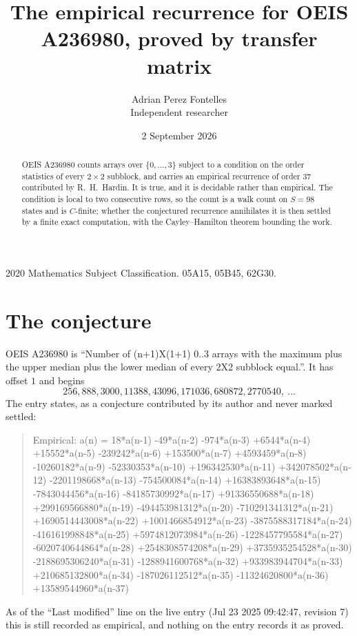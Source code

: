 \documentclass[11pt,a4paper]{article}
\title{The empirical recurrence for OEIS A236980, proved by transfer matrix}
\author{Adrian Perez Fontelles\\ \small Independent researcher}
\date{2 September 2026}
\theoremstyle{plain}
\theoremstyle{definition}
\begin{document}
\maketitle

\begin{abstract}
OEIS A236980 counts arrays over $\{0,\dots,3\}$ subject to a condition on the order
statistics of every $2\times2$ subblock, and carries an empirical recurrence of order
$37$ contributed by R.~H.~Hardin. It is true, and it is decidable rather than empirical.
The condition is local to two consecutive rows, so the count is a walk count on $S=98$
states and is $C$-finite; whether the conjectured recurrence annihilates it is then settled by
a finite exact computation, with the Cayley--Hamilton theorem bounding the work.
\end{abstract}

\noindent\small 2020 Mathematics Subject Classification. 05A15, 05B45, 62G30.\normalsize

\section{The conjecture}

OEIS A236980 is ``Number of (n+1)X(1+1) 0..3 arrays with the maximum plus the upper median plus the lower median of every 2X2 subblock equal.''. It has offset $1$ and begins
\[
256, 888, 3000, 11388, 43096, 171036, 680872, 2770540,\ \dots
\]
The entry states, as a conjecture contributed by its author and never marked settled:
\begin{quote}
Empirical: a(n) = 18*a(n-1) -49*a(n-2) -974*a(n-3) +6544*a(n-4) +15552*a(n-5) -239242*a(n-6) +153500*a(n-7) +4593459*a(n-8) -10260182*a(n-9) -52330353*a(n-10) +196342530*a(n-11) +342078502*a(n-12) -2201198668*a(n-13) -754500084*a(n-14) +16383893648*a(n-15) -7843044456*a(n-16) -84185730992*a(n-17) +91336550688*a(n-18) +299169566880*a(n-19) -494453981312*a(n-20) -710291341312*a(n-21) +1690514443008*a(n-22) +1001466854912*a(n-23) -3875588317184*a(n-24) -416161998848*a(n-25) +5974812073984*a(n-26) -1228457795584*a(n-27) -6020740644864*a(n-28) +2548308574208*a(n-29) +3735935254528*a(n-30) -2188695306240*a(n-31) -1288941600768*a(n-32) +933983944704*a(n-33) +210685132800*a(n-34) -187026112512*a(n-35) -11324620800*a(n-36) +13589544960*a(n-37)
\end{quote}
As of the ``Last modified'' line on the live entry (Jul 23 2025 09:42:47, revision 7) this is still
recorded as empirical, and nothing on the entry records it as proved.
\end{document}
